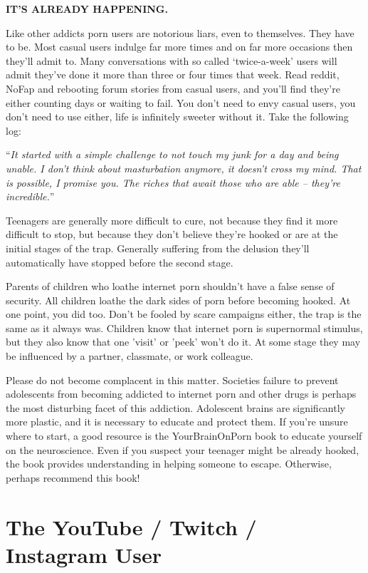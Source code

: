 \documentclass[
]{book}
\begin{document}
\textbf{IT'S ALREADY HAPPENING.}

Like other addicts porn users are notorious liars, even to themselves. They have to be. Most casual users indulge far more times and on far more occasions then they'll admit to. Many conversations with so called `twice-a-week' users will admit they've done it more than three or four times that week. Read reddit, NoFap and rebooting forum stories from casual users, and you'll find they're either counting days or waiting to fail. You don't need to envy casual users, you don't need to use either, life is infinitely sweeter without it. Take the following log:

``\emph{It started with a simple challenge to not touch my junk for a day and being unable. I don't think about masturbation anymore, it doesn't cross my mind. That is possible, I promise you. The riches that await those who are able -- they're incredible.}''

Teenagers are generally more difficult to cure, not because they find it more difficult to stop, but because they don't believe they're hooked or are at the initial stages of the trap. Generally suffering from the delusion they'll automatically have stopped before the second stage.

Parents of children who loathe internet porn shouldn't have a false sense of security. All children loathe the dark sides of porn before becoming hooked. At one point, you did too. Don't be fooled by scare campaigns either, the trap is the same as it always was. Children know that internet porn is supernormal stimulus, but they also know that one 'visit' or 'peek' won't do it. At some stage they may be influenced by a partner, classmate, or work colleague.

Please do not become complacent in this matter. Societies failure to prevent adolescents from becoming addicted to internet porn and other drugs is perhaps the most disturbing facet of this addiction. Adolescent brains are significantly more plastic, and it is necessary to educate and protect them. If you're unsure where to start, a good resource is the YourBrainOnPorn book to educate yourself on the neuroscience. Even if you suspect your teenager might be already hooked, the book provides understanding in helping someone to escape. Otherwise, perhaps recommend this book!

\hypertarget{the-youtube-twitch-instagram-user}{%
\chapter{The YouTube / Twitch / Instagram User}\label{the-youtube-twitch-instagram-user}}
\end{document}
